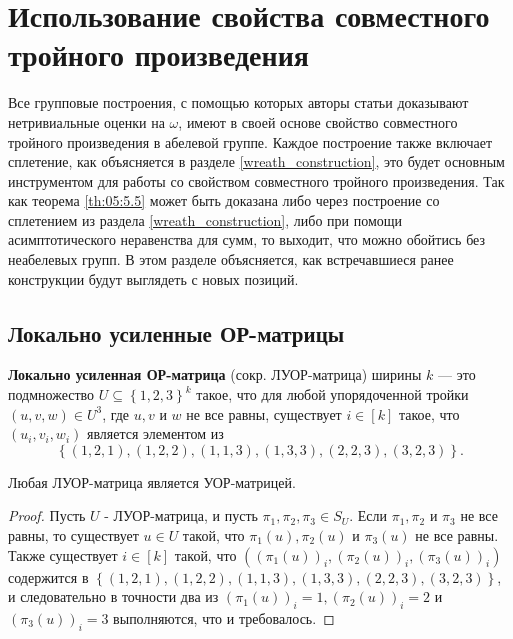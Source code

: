 \section{Использование свойства совместного тройного произведения}

Все групповые построения, с помощью которых авторы статьи доказывают нетривиальные оценки на $\omega$, имеют в своей основе свойство совместного тройного произведения в абелевой группе. Каждое построение также включает сплетение, как объясняется в разделе \ref{wreath_construction}, это будет основным инструментом для работы со свойством совместного тройного произведения. Так как теорема \ref{th:05:5.5} может быть доказана либо через построение со сплетением из раздела \ref{wreath_construction}, либо при помощи асимптотического неравенства для сумм, то выходит, что можно обойтись без неабелевых групп. В этом разделе объясняется, как встречавшиеся ранее конструкции будут выглядеть с новых позиций.

\subsection{Локально усиленные ОР-матрицы}

\begin{definition}
  \label{def:LSUSP} \textbf{Локально усиленная ОР-матрица} (сокр. ЛУОР-матрица) ширины $k$ --- это подмножество $U \subseteq \left\{ 1,2,3 \right\}^k$ такое, что для любой упорядоченной тройки $(u,v,w) \in U^3$, где $u,v$ и $w$ не все равны, существует $i \in [k]$ такое, что $(u_i, v_i, w_i)$ является элементом из
  \[
  	\left\{ (1,2,1), (1,2,2), (1,1,3), (1,3,3), (2,2,3), (3,2,3) \right\}.
  \]
\end{definition}

\begin{lemma}
  \label{lem:05:6.1} Любая ЛУОР-матрица является УОР-матрицей.
\end{lemma}
\begin{proof}
Пусть $U$ - ЛУОР-матрица, и пусть $\pi_1, \pi_2, \pi_3 \in S_U$. Если $\pi_1, \pi_2$ и $\pi_3$ не все равны, то существует $u \in U$ такой, что $\pi_1(u), \pi_2(u)$ и $\pi_3(u)$ не все равны. Также существует $i \in [k]$ такой, что $((\pi_1(u))_i, (\pi_2(u))_i, (\pi_3(u))_i)$ содержится в $\left\{ (1,2,1), (1,2,2), (1,1,3), (1,3,3), (2,2,3), (3,2,3) \right\}$, и следовательно в точности два из $(\pi_1(u))_i=1, (\pi_2(u))_i=2$ и $(\pi_3(u))_i=3$ выполняются, что и требовалось.
\end{proof}

